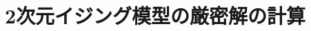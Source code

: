 \documentclass[a4paper,11pt]{jsreport}
\begin{document}

\renewcommand{\bibname}{参考文献} %

\appendix
\renewcommand{\thechapter}{\Alph{chapter}}
\renewcommand{\thesection}{\Alph{chapter}.\arabic{section}}
\setcounter{section}{0}
\renewcommand{\theequation}{\Alph{chapter}.\arabic{equation}}
\setcounter{equation}{0}

\chapter{2次元イジング模型の厳密解の計算}
\end{document}
